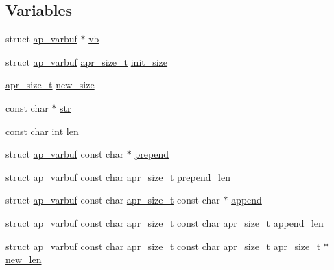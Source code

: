 \subsection*{Variables}
\begin{DoxyCompactItemize}
\item 
struct \hyperlink{structap__varbuf}{ap\+\_\+varbuf} $\ast$ \hyperlink{group__APACHE__CORE__VARBUF_ga29f1d61bf61bdf84c1b79497ddbe762d}{vb}
\item 
struct \hyperlink{structap__varbuf}{ap\+\_\+varbuf} \hyperlink{group__apr__platform_gaaa72b2253f6f3032cefea5712a27540e}{apr\+\_\+size\+\_\+t} \hyperlink{group__APACHE__CORE__VARBUF_ga2b1215bab2d440a698e934e8e82e8e0e}{init\+\_\+size}
\item 
\hyperlink{group__apr__platform_gaaa72b2253f6f3032cefea5712a27540e}{apr\+\_\+size\+\_\+t} \hyperlink{group__APACHE__CORE__VARBUF_gac96138121b6e374c1776c4cb294be263}{new\+\_\+size}
\item 
const char $\ast$ \hyperlink{group__APACHE__CORE__VARBUF_gaf25d6dc49269fa2003ac7c7fa6f13915}{str}
\item 
const char \hyperlink{pcre_8txt_a42dfa4ff673c82d8efe7144098fbc198}{int} \hyperlink{group__APACHE__CORE__VARBUF_ga0ef2027e34e9460e00be18b803496433}{len}
\item 
struct \hyperlink{structap__varbuf}{ap\+\_\+varbuf} const char $\ast$ \hyperlink{group__APACHE__CORE__VARBUF_ga14fec260f1548ac2e32cec0a48b0f772}{prepend}
\item 
struct \hyperlink{structap__varbuf}{ap\+\_\+varbuf} const char \hyperlink{group__apr__platform_gaaa72b2253f6f3032cefea5712a27540e}{apr\+\_\+size\+\_\+t} \hyperlink{group__APACHE__CORE__VARBUF_ga1d26de30230343018df48e23606881ab}{prepend\+\_\+len}
\item 
struct \hyperlink{structap__varbuf}{ap\+\_\+varbuf} const char \hyperlink{group__apr__platform_gaaa72b2253f6f3032cefea5712a27540e}{apr\+\_\+size\+\_\+t} const char $\ast$ \hyperlink{group__APACHE__CORE__VARBUF_ga999afdbb8f118076679df856cc264ab1}{append}
\item 
struct \hyperlink{structap__varbuf}{ap\+\_\+varbuf} const char \hyperlink{group__apr__platform_gaaa72b2253f6f3032cefea5712a27540e}{apr\+\_\+size\+\_\+t} const char \hyperlink{group__apr__platform_gaaa72b2253f6f3032cefea5712a27540e}{apr\+\_\+size\+\_\+t} \hyperlink{group__APACHE__CORE__VARBUF_ga6eba5e397cc9fd09dac1d8ec9c5118c9}{append\+\_\+len}
\item 
struct \hyperlink{structap__varbuf}{ap\+\_\+varbuf} const char \hyperlink{group__apr__platform_gaaa72b2253f6f3032cefea5712a27540e}{apr\+\_\+size\+\_\+t} const char \hyperlink{group__apr__platform_gaaa72b2253f6f3032cefea5712a27540e}{apr\+\_\+size\+\_\+t} \hyperlink{group__apr__platform_gaaa72b2253f6f3032cefea5712a27540e}{apr\+\_\+size\+\_\+t} $\ast$ \hyperlink{group__APACHE__CORE__VARBUF_ga0b026c790ce19343cfa23a28bfc780fa}{new\+\_\+len}

\end{DoxyCompactItemize}
